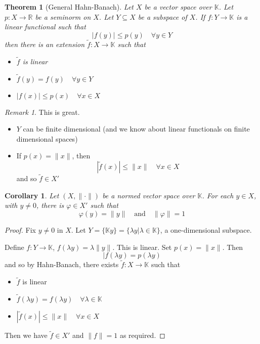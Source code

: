 \documentclass[10pt, oneside, reqno]{amsbook}
\theoremstyle{plain}%
\newtheorem{thm}{Theorem}[section]
\newtheorem*{cor}{Corollary}
\theoremstyle{definition}
\theoremstyle{remark}
\newtheorem*{rem}{Remark}
\newcommand{\R}{\mathbb{R}}
\newcommand{\K}{\mathbb{K}}
\renewcommand{\phi}{\varphi}
\begin{document}
\begin{thm}[General Hahn-Banach]
    Let $X$ be a vector space over $\K$.  Let $p: X \rightarrow \R$ be a seminorm on $X$.  Let $Y \subseteq X$ be a subspace of $X$.  If $f : Y \rightarrow \K$ is a linear functional such that \[
        | f(y) | \leq p(y) \quad \forall y \in Y
    \] then there is an extension $\tilde{f} : X \rightarrow \K$ such that 
    \begin{itemize}
        \item $\tilde{f}$ is linear
        \item $\tilde f (y) = f(y) \quad \forall y \in Y$
        \item $|f(x)| \leq p(x) \quad \forall x \in X$
    \end{itemize}
\end{thm}

\begin{rem}
    This is great.
    \begin{itemize}
        \item $Y$ can be finite dimensional (and we know about linear functionals on finite dimensional spaces)
        \item If $p(x) = \| x \|$, then \[
            |\tilde f (x) | \leq \|x \| \quad \forall x \in X
        \] and so $\tilde f \in X'$
    \end{itemize}
\end{rem}

\begin{cor}
    Let $(X, \| \cdot \|)$ be a normed vector space over $\K$.  For each $y \in X$, with $y \neq 0$, there is $\phi \in X'$ such that \[
        \phi(y) = \| y \| \quad \text{and} \quad \| \phi \| = 1
    \]
\end{cor}
\begin{proof}
    Fix $y \neq 0$ in $X$.  Let $Y = \{ \K y \} = \{ \lambda y | \lambda \in \K \}$, a one-dimensional subspace.  
    
    Define $f : Y \rightarrow \K$, $f( \lambda y) = \lambda \| y \|$.  This is linear.  Set $p(x) = \| x \|$.  Then \[
        | f(\lambda y ) = p(\lambda y)
    \] and so by Hahn-Banach, there exists $\tilde f : X \rightarrow \K$ such that
    \begin{itemize}
        \item $\tilde f$ is linear
        \item $\tilde f(\lambda y) = f( \lambda y) \quad \forall \lambda \in \K$
        \item $| \tilde f (x) | \leq \| x \| \quad \forall x \in X$
    \end{itemize}
    Then we  have $\tilde f \in X'$ and $\| f \| = 1$ as required.
\end{proof}
\end{document}
